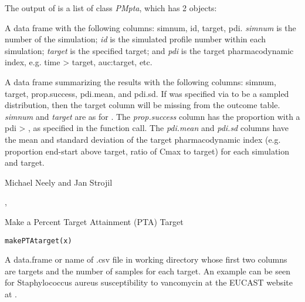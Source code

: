 \documentclass[a4paper]{book}
\begin{document}
\begin{Value}
The output of  is a list of class \emph{PMpta},
which has 2 objects:
\begin{ldescription}
\item[\code{results }] A data frame with the following columns: simnum, id, target, pdi.  
\emph{simnum} is the number of the simulation; \emph{id} is the simulated profile number
within each simulation; \emph{target} is the specified target; and \emph{pdi} is
the target pharmacodynamic index, e.g. time > target, auc:target, etc.
\item[\code{outcome }] A data frame summarizing the results with the following columns: simnum, target, prop.success, pdi.mean, and pdi.sd.
If  was specified via  to be a sampled distribution, then
the target column will be missing from the outcome table.
\emph{simnum} and \emph{target} are as for .  The \emph{prop.success} column has the proportion with a pdi > ,
as specified in the function call.  The \emph{pdi.mean} and \emph{pdi.sd} columns have the 
mean and standard deviation of the target pharmacodynamic index (e.g. proportion end-start above target, ratio of Cmax to target) for each simulation and target.
\end{ldescription}
\end{Value}
%
\begin{Author}\relax
Michael Neely and Jan Strojil
\end{Author}
%
\begin{SeeAlso}\relax
{}, 
\end{SeeAlso}
%
\begin{Description}\relax
Make a Percent Target Attainment (PTA) Target
\end{Description}
%
\begin{Usage}
\begin{verbatim}
makePTAtarget(x)
\end{verbatim}
\end{Usage}
%
\begin{Arguments}
\begin{ldescription}
\item[\code{x}] A data.frame or name of .csv file in working directory whose first two
columns are targets and the number of samples for each target.  An example can be
seen for Staphylococcus aureus susceptibility to vancomycin at the EUCAST website
at .
\end{ldescription}
\end{Arguments}
\end{document}
